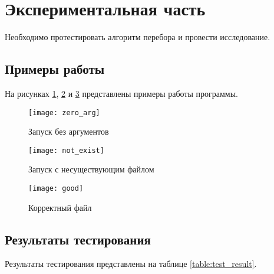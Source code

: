 \newpage
\section{Экспериментальная часть}

Необходимо протестировать алгоритм перебора и провести исследование.

\subsection{Примеры работы}

На рисунках \ref{img:zero_arg}, \ref{img:not_exist} и \ref{img:good} представлены примеры работы программы.

\begin{figure}[H]
    \centering
    \texttt{[image: zero\_arg]}
    \caption{Запуск без аргументов}
    \label{img:zero_arg}
\end{figure}

\begin{figure}[H]
    \centering
    \texttt{[image: not\_exist]}
    \caption{Запуск с несуществующим файлом}
    \label{img:not_exist}
\end{figure}

\begin{figure}[H]
    \centering
    \texttt{[image: good]}
    \caption{Корректный файл}
    \label{img:good}
\end{figure}

\subsection{Результаты тестирования}

Результаты тестирования представлены на таблице \ref{table:test_result}.


